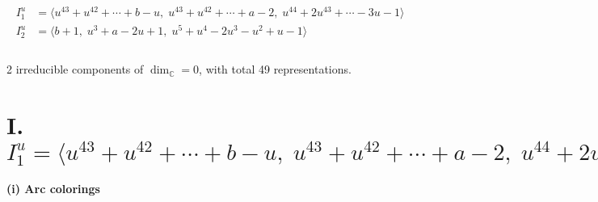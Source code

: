 \documentclass[1p]{elsarticle_modified}
\theoremstyle{definition}
\begin{document}
\begin{align*}
I^u_{1}&=\langle 
u^{43}+u^{42}+\cdots+b- u,\;u^{43}+u^{42}+\cdots+a-2,\;u^{44}+2 u^{43}+\cdots-3 u-1\rangle \\
I^u_{2}&=\langle 
b+1,\;u^3+a-2 u+1,\;u^5+u^4-2 u^3- u^2+u-1\rangle \\
\\
\end{align*}
\raggedright * 2 irreducible components of $\dim_{\mathbb{C}}=0$, with total 49 representations.\\
\newpage
\renewcommand{\arraystretch}{1}
\centering \section*{I. $I^u_{1}= \langle u^{43}+u^{42}+\cdots+b- u,\;u^{43}+u^{42}+\cdots+a-2,\;u^{44}+2 u^{43}+\cdots-3 u-1 \rangle$}
\flushleft \textbf{(i) Arc colorings}\\
\end{document}
